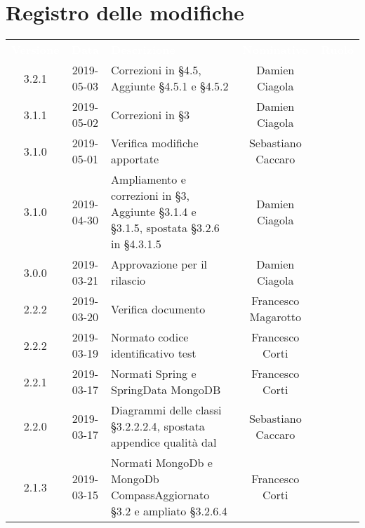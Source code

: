 
\section*{Registro delle modifiche}
{
	\renewcommand{\arraystretch}{1.5}
	\centering
	\begin{longtable}{ c c C{4cm} c c }
		
		\textcolor{white}{\textbf{Versione}} & \textcolor{white}{\textbf{Data}} & \textcolor{white}{\textbf{Descrizione}} & \textcolor{white}{\textbf{Nominativo}} & \textcolor{white}{\textbf{Ruolo}}\\
		3.2.1 & 2019-05-03 & Correzioni in §4.5, Aggiunte §4.5.1 e §4.5.2  & Damien Ciagola & \reda{} \\
		
		3.1.1 & 2019-05-02 & Correzioni in §3  & Damien Ciagola & \reda{} \\	
		
		3.1.0 & 2019-05-01 & Verifica modifiche apportate & Sebastiano Caccaro & \ver{} \\		
		
		3.1.0 & 2019-04-30 & Ampliamento e correzioni in §3, Aggiunte §3.1.4 e §3.1.5, spostata §3.2.6 in §4.3.1.5 & Damien Ciagola & \reda{} \\
		
	3.0.0 & 2019-03-21 & Approvazione per il rilascio & Damien Ciagola & \Res{} \\
			
	2.2.2 & 2019-03-20 & 
	Verifica documento & Francesco Magarotto & \ver{} \\	
		
		2.2.2 & 2019-03-19 & Normato codice identificativo test & Francesco Corti & \reda{} \\
		
		2.2.1 & 2019-03-17 & Normati Spring e SpringData MongoDB & Francesco Corti & \reda{} \\		
		
		2.2.0 & 2019-03-17 & Diagrammi delle classi §3.2.2.2.4, spostata appendice qualità dal \PdQ & Sebastiano Caccaro & \reda{} \\		
		
		2.1.3 & 2019-03-15 & Normati MongoDb e MongoDb Compass\newline Aggiornato §3.2 e ampliato §3.2.6.4 & Francesco Corti & \reda{} \\		
		

\end{longtable}}
